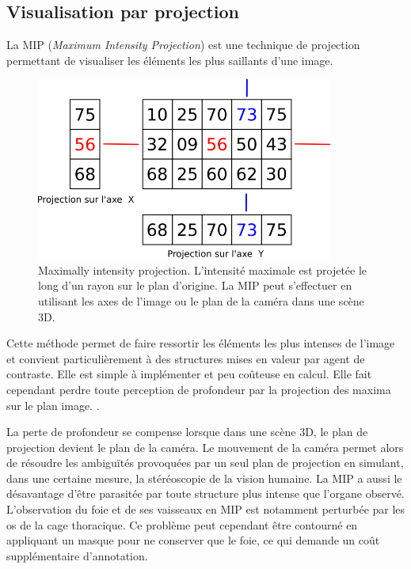       \subsection{Visualisation par projection}
      La MIP (\textit{Maximum Intensity Projection}) est une technique de projection permettant de visualiser les éléments les plus saillants d'une image.  
      \begin{figure}[h]
        \centering
        \includegraphics[height=6cm]{Images/3D_mip_ray.png}
        \caption{Maximally intensity projection. L'intensité maximale est projetée le long d'un rayon sur le plan d'origine. La MIP peut s'effectuer en utilisant les axes de l'image ou le plan de la caméra dans une scène 3D.}
        \label{fig:MIP_visualisation}
      \end{figure}
      Cette méthode permet de faire ressortir les éléments les plus intenses de l'image et convient particulièrement à des structures mises en valeur par agent de contraste. Elle est simple à implémenter et peu coûteuse en calcul. Elle fait cependant perdre toute perception de profondeur par la projection des maxima sur le plan image. .

      La perte de profondeur se compense lorsque dans une scène 3D, le plan de projection devient le plan de la caméra. Le mouvement de la caméra permet alors de résoudre les ambiguïtés provoquées par un seul plan de projection en simulant, dans une certaine mesure, la stéréoscopie de la vision humaine.
      La MIP a aussi le désavantage d'être parasitée par toute structure plus intense que l'organe observé. L'observation du foie et de ses vaisseaux en MIP est notamment perturbée par les os de la cage thoracique. Ce problème peut cependant être contourné en appliquant un masque pour ne conserver que le foie, ce qui demande un coût supplémentaire d'annotation.
